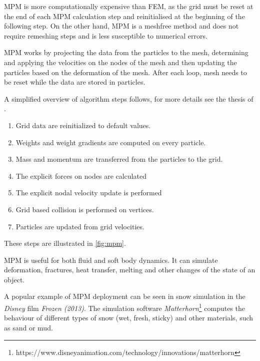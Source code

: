 MPM is more computationally expensive than FEM, as the grid must be reset at the end of each MPM calculation step and reinitialised at the beginning of the following step. On the other hand, MPM is a meshfree method and does not require remeshing steps and is less susceptible to numerical errors. 

MPM works by projecting the data from the particles to the mesh, determining and applying the velocities on the nodes of the mesh and then updating the particles based on the deformation of the mesh. After each loop, mesh needs to be reset while the data are stored in particles.

 A simplified overview of algorithm steps follows, for more details see the thesis of \citet{jiang2015material}.
 
\begin{enumerate}
    \item Grid data are reinitialized to default values.
    \item Weights and weight gradients are computed on every particle.
    \item Mass and momentum are transferred from the particles to the grid.
    \item The explicit forces on nodes are calculated
    \item The explicit nodal velocity update is performed
    \item Grid based collision is performed on vertices.
    \item Particles are updated from grid velocities.
\end{enumerate}
These steps are illustrated in \cref{fig:mpm}.

MPM is useful for both fluid and soft body dynamics. It can simulate deformation, fractures, heat transfer, melting and other changes of the state of an object.

A popular example of MPM deployment can be seen in snow simulation in the \emph{Disney} film \emph{Frozen (2013)}. The simulation software \emph{Matterhorn}\footnote{https://www.disneyanimation.com/technology/innovations/matterhorn} computes the behaviour of different types of snow (\eg wet, fresh, sticky) and other materials, such as sand or mud.

